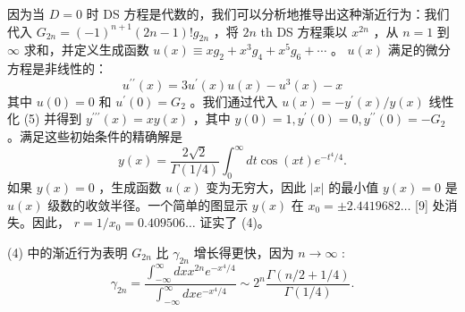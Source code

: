 \documentclass[UTF8]{article}
\begin{document}
因为当 \( D=0 \) 时 DS 方程是代数的，我们可以分析地推导出这种渐近行为：我们代入 \( G_{2 n}=(-1)^{n+1}(2 n-1) ! g_{2 n} \) ，将 \( 2 n \) th DS 方程乘以 \( x^{2 n} \) ，从 \( n=1 \) 到 \( \infty \) 求和，并定义生成函数 \( u(x) \equiv x g_{2}+x^{3} g_{4}+x^{5} g_{6}+\cdots \) 。 \( u(x) \) 满足的微分方程是非线性的： \[u^{\prime \prime}(x)=3 u^{\prime}(x) u(x)-u^{3}(x)-x
\] 其中 \( u(0)=0 \) 和 \( u^{\prime}(0)=G_{2} \) 。我们通过代入 \( u(x)=-y^{\prime}(x) / y(x) \) 线性化 (5) 并得到 \( y^{\prime \prime \prime}(x)=x y(x) \) ，其中 \( y(0)=1, y^{\prime}(0)=0, y^{\prime \prime}(0)=-G_{2} \) 。满足这些初始条件的精确解是 \[y(x)=\frac{2 \sqrt{2}}{\Gamma(1 / 4)} \int_{0}^{\infty} d t \cos (x t) e^{-t^{4} / 4} .
\] 如果 \( y(x)=0 \) ，生成函数 \( u(x) \) 变为无穷大，因此 \( |x| \) 的最小值 \( y(x)=0 \) 是 \( u(x) \) 级数的收敛半径。一个简单的图显示 \( y(x) \) 在 \( x_{0}= \pm 2.4419682 \ldots \) [9] 处消失。因此， \( r=1 / x_{0}=0.409506 \ldots \) 证实了 (4)。

(4) 中的渐近行为表明 \( G_{2 n} \) 比 \( \gamma_{2 n} \) 增长得更快，因为 \( n \rightarrow \infty \) : \[
\gamma_{2 n}=\frac{\int_{-\infty}^{\infty} d x x^{2 n} e^{-x^{4} / 4}}{\int_{-\infty}^{\infty} d x e^{-x^{4} / 4}} \sim 2^{n} \frac{\Gamma(n / 2+1 / 4)}{\Gamma(1 / 4)} .
\]
\end{document}
